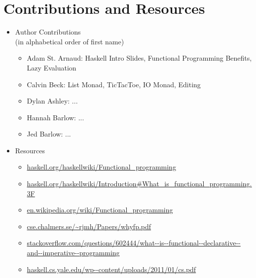\documentclass[]{beamer}
\begin{document}
\begin{frame}
\maketitle
\end{frame}





\section{Contributions and Resources}
\begin{frame}[fragile]
    \begin{itemize}
        \item Author Contributions\\{\scriptsize(in alphabetical order of first name)}
            \begin{itemize}
                \item Adam St. Arnaud:
                    Haskell Intro Slides, Functional Programming Benefits, Lazy Evaluation
                \item Calvin Beck:
                    List Monad, TicTacToe, IO Monad, Editing
                \item Dylan Ashley:
                    ...
                \item Hannah Barlow:
                    ...
                \item Jed Barlow:
                    ...
            \end{itemize}
        \item Resources
            \begin{itemize}
                \item \url{haskell.org/haskellwiki/Functional_programming}
                \item \url{haskell.org/haskellwiki/Introduction#What_is_functional_programming.3F}
                \item \url{en.wikipedia.org/wiki/Functional_programming}
                \item \url{cse.chalmers.se/~rjmh/Papers/whyfp.pdf}
                \item \url{stackoverflow.com/questions/602444/what--is--functional--declarative--and--imperative--programming}
                \item \url{haskell.cs.yale.edu/wp--content/uploads/2011/01/cs.pdf}
            \end{itemize}
    \end{itemize}
\end{frame}
\end{document}
